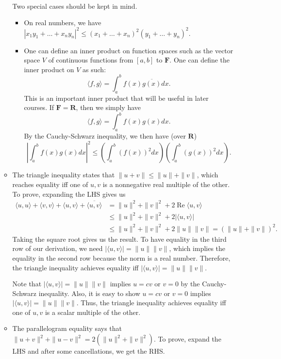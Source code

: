 \documentclass{article}
\newcommand{\R}{\mathbf{R}}
\newcommand{\F}{\mathbf{F}}
\renewcommand{\Re}{\operatorname{Re}}
\newcommand{\conj}[1]{\overline{#1}}
\newcommand{\inp}[2]{\langle #1, #2 \rangle}
\newcommand{\nm}[1]{\| #1 \|}
\begin{document}
\begin{itemize}
\begin{itemize}
        Two special cases should be kept in mind.
        \begin{itemize}
            \item On real numbers, we have $|x_1y_1+\dots+x_ny_n|^2 \leq (x_1+\dots+x_n)^2(y_1+\dots+y_n)^2$.
            \item One can define an inner product on function spaces such as the vector space $V$ of continuous functions from $[a,b]$ to $\F$. One can define the inner product on $V$ as such: $$\inp{f}{g} = \int_a^b f(x)\conj{g(x)} dx.$$ This is an important inner product that will be useful in later courses. If $\F = \R$, then we simply have $$\inp{f}{g} = \int_a^b f(x)g(x) dx.$$ By the Cauchy-Schwarz inequality, we then have (over $\R$) $$\left|\int_a^b f(x)g(x)dx\right|^2 \leq \left(\int_a^b (f(x))^2 dx \right) \left(\int_a^b (g(x))^2 dx \right).$$
        \end{itemize}
        \item The triangle inequality states that $\|u+v\| \leq \|u\|+\|v\|$, which reaches equality iff one of $u,v$ is a nonnegative real multiple of the other.
        To prove, expanding the LHS gives us
        \begin{align*}
            \inp{u}{u}+\inp{v}{v}+\inp{u}{v}+\conj{\inp{u}{v}} & = \nm{u}^2+\nm{v}^2+2 \Re{\inp{u}{v}} \\ & \leq \nm{u}^2+\nm{v}^2+2|\inp{u}{v}| \\ & \leq \nm{u}^2+\nm{v}^2+2\nm{u}\nm{v} = (\nm{u}+\nm{v})^2.
        \end{align*}
        Taking the square root gives us the result. To have equality in the third row of our derivation, we need $|\inp{u}{v}| = \nm{u}\nm{v}$, which implies the equality in the second row because the norm is a real number. Therefore, the triangle inequality achieves equality iff $|\inp{u}{v}| = \nm{u}\nm{v}$.
        
        Note that $|\inp{u}{v}| = \nm{u}\nm{v}$ implies $u=cv$ or $v=0$ by the Cauchy-Schwarz inequality. Also, it is easy to show $u=cv$ or $v=0$ implies $|\inp{u}{v}| = \nm{u}\nm{v}$. Thus, the triangle inequality achieves equality iff one of $u,v$ is a scalar multiple of the other.
        \item The parallelogram equality says that $\|u+v\|^2+\|u-v\|^2 = 2(\|u\|^2+ \|v\|^2)$. To prove, expand the LHS and after some cancellations, we get the RHS.
    \end{itemize}
\end{itemize}
\end{document}
